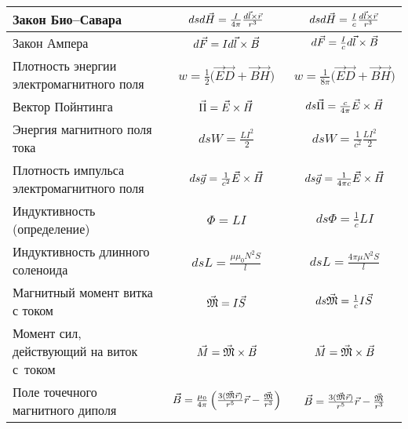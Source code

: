 \begin{longtable}{|L{4cm}|c|c|}
	Закон Био--Савара                            &      $ds d\vec{H}=\frac{I}{4\pi}\frac{d\vec{l} \times \vec{r}}{r^3}$      &                  $ds d\vec{H}=\frac{I}{c}\frac{d\vec{l} \times \vec{r}}{r^3}$                  \\[2ex] \hline
	Закон Ампера                                 &                    $d\vec{F}=Id\vec{l} \times \vec{B}$                     &                          $d\vec{F}=\frac{I}{c}d\vec{l} \times \vec{B}$                          \\ \hline
	Плотность энергии электромагнитного поля     &           $w=\frac12\bigl(\vec{E}\vec{D}+\vec{B}\vec{H}\bigr)$            &                  $w=\frac{1}{8\pi}\bigl(\vec{E}\vec{D}+\vec{B}\vec{H}\bigr)$                   \\ \hline
	Вектор Пойнтинга                             &                     $\vec{\Pi}=\vec{E} \times \vec{H}$                     &                       $ds\vec{\Pi}=\frac{c}{4\pi}\vec{E} \times \vec{H}$                       \\[1ex] \hline
	Энергия магнитного поля тока                 &                          $ds W=\frac{LI^2}{2}$                           &                              $ds W=\frac{1}{c^2}\frac{LI^2}{2}$                               \\[1ex] \hline
	Плотность импульса электромагнитного поля    &              $ds\vec{g}=\frac{1}{c^2}\vec{E} \times \vec{H}$              &                       $ds\vec{g}=\frac{1}{4\pi c}\vec{E} \times \vec{H}$                       \\  \hline
	Индуктивность (определение)				  	 &		$\Phi=LI$															  &			$ds\Phi=\frac{1}{c}LI$																   \\ \hline
	Индуктивность длинного соленоида			 &		$ds L=\frac{\mu\mu_0N^2S}{l}$										  &			$ds L=\frac{4\pi\mu N^2S}{l}$														   \\ \hline
	Магнитный момент витка с током				 &  	$\vec{\mathfrak M}=I\vec{S}$												  &			$ds\vec{\mathfrak M}=\frac{1}{c}I\vec{S}$												   \\ \hline
	Момент сил, действующий на виток с~током	 &		$\vec{M}=\vec{\mathfrak M} \times \vec{B}$									  &			$\vec{M}=\vec{\mathfrak M} \times \vec{B}$													   \\ \hline
	Поле точечного магнитного диполя			 &	$\vec{B}=\frac{\mu_0}{4\pi}\left(\frac{3(\vec{\mathfrak M}\vec{r})}{r^5}\vec{r}-\frac{\vec{\mathfrak M}}{r^3}\right)$	&$\vec{B}=\frac{3(\vec{\mathfrak M}\vec{r})}{r^5}\vec{r}-\frac{\vec{\mathfrak M}}{r^3}$\\ \hline

\end{longtable}
